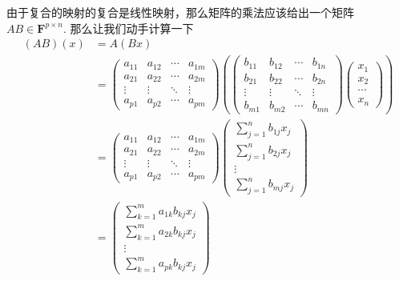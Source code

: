 由于复合的映射的复合是线性映射，那么矩阵的乘法应该给出一个矩阵 $AB\in\mathbf{F}^{p\times n}$. 那么让我们动手计算一下
\begin{align*}
    (AB)(x) &= A(Bx) \\
    &= \begin{pmatrix}
        a_{11} & a_{12} & \cdots & a_{1m} \\
        a_{21} & a_{22} & \cdots & a_{2m} \\
        \vdots & \vdots & \ddots & \vdots \\
        a_{p1} & a_{p2} & \cdots & a_{pm}
    \end{pmatrix} \left( \begin{pmatrix}
        b_{11} & b_{12} & \cdots & b_{1n} \\
        b_{21} & b_{22} & \cdots & b_{2n} \\
        \vdots & \vdots & \ddots & \vdots \\
        b_{m1} & b_{m2} & \cdots & b_{mn}
    \end{pmatrix} \begin{pmatrix}
        x_1 \\ x_2 \\ \cdots \\ x_n
    \end{pmatrix} \right)\\
    &= \begin{pmatrix}
        a_{11} & a_{12} & \cdots & a_{1m} \\
        a_{21} & a_{22} & \cdots & a_{2m} \\
        \vdots & \vdots & \ddots & \vdots \\
        a_{p1} & a_{p2} & \cdots & a_{pm}
    \end{pmatrix} \begin{pmatrix}
        \sum_{j=1}^n b_{1j} x_j \\
        \sum_{j=1}^n b_{2j} x_j \\
        \vdots \\
        \sum_{j=1}^n b_{mj} x_j
    \end{pmatrix} \\
    &= \begin{pmatrix}
        \sum_{k=1}^m a_{1k} b_{kj} x_j \\
        \sum_{k=1}^m a_{2k} b_{kj} x_j \\
        \vdots \\
        \sum_{k=1}^m a_{pk} b_{kj} x_j
    \end{pmatrix} \\

\end{align*}
